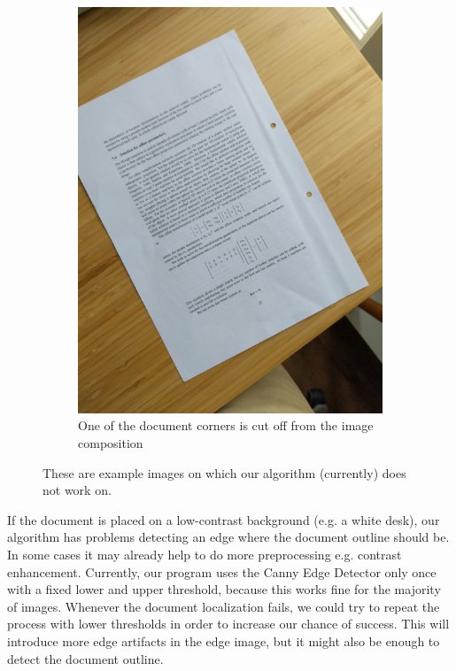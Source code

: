 \documentclass[bibliography=totoc]{scrartcl}
\begin{document}
\begin{figure}[h!]
\begin{subfigure}[b]{0.3\linewidth}
			\includegraphics[width=\linewidth]{imgs/not_working/missing_corner.jpg}
			\caption{One of the document corners is cut off from the image composition}
		\end{subfigure}
		\caption{These are example images on which our algorithm (currently) does not work on.}
		\label{fig:known_problems}
	  \end{figure}
	
	If the document is placed on a low-contrast background (e.g. a white desk), our algorithm has problems detecting an edge where the document outline should be.
	In some cases it may already help to do more preprocessing e.g. contrast enhancement.
	Currently, our program uses the Canny Edge Detector only once with a fixed lower and upper threshold, because this works fine for the majority of images.
	Whenever the document localization fails, we could try to repeat the process with lower thresholds in order to increase our chance of success. 
	This will introduce more edge artifacts in the edge image, but it might also be enough to detect the document outline.
\end{document}
